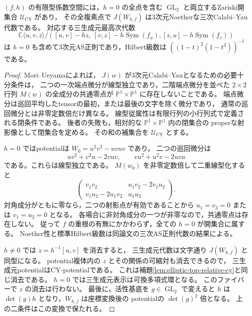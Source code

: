 \begin{lemma}[全可換最高次点を含む正則開集合]
\label{lem:all-binary-quartic-as-open}
$(f,h)$ の有限型係数空間には，$h=0$ の全点を含む
$\operatorname{GL}_2$ と両立するZariski開集合 $\mathcal U_{\mathrm{CY}}$ があり，
その全複素点で $J(W_{h,f})$ は3次元Noetherな三次Calabi--Yau代数である。
対応する三生成元最高次代数
\[
 \mathbb C\langle u,v,z\rangle/
 ([u,v]-hz,\ [v,z]-h\operatorname{Sym}(f_u),
                 [z,u]-h\operatorname{Sym}(f_v))
\]
は $h=0$ も含めて3次元AS正則であり，Hilbert級数は
$((1-t)^2(1-t^2))^{-1}$ である。
\end{lemma}
\begin{proof}
Mori--Ueyama\cite[Theorem~3.4]{MoriUeyama2019}によれば，
$J(w)$ が3次元Calabi--Yauとなるための必要十分条件は，
二つの一次端点微分が線型独立であり，二階端点微分を並べた
$2\times2$ 行列 $M(w)$ の全成分の共通零点が
$\mathbb P^1\times\mathbb P^1$ に存在しないことである。
端点微分は巡回平均したtensorの最初，または最後の文字を除く微分であり，
通常の巡回微分とは非零定数倍だけ異なる。
線型従属性は有限行列の小行列式で定義される閉条件である。
後者の失敗も，相対的な $\mathbb P^1\times\mathbb P^1$ 内の閉集合の
properな射影像として閉集合を定める。
その和の補集合を $\mathcal U_{\mathrm{CY}}$ とする。

$h=0$ ではpotentialは $W_0=u^2v^2-uvuv$ であり，
二つの巡回微分は
\[
 uv^2+v^2u-2vuv,\qquad vu^2+u^2v-2uvu
\]
である。これらは線型独立である。
$M(w_0)$ を非零定数倍して二重線型化すると
\[
 \begin{pmatrix}
 v_1v_2&u_1v_2-2v_1u_2\\
 v_1u_2-2u_1v_2&u_1u_2
 \end{pmatrix}.
\]
対角成分がともに零なら，二つの射影点が有効であることから
$u_1=v_2=0$ または $v_1=u_2=0$ となる。
各場合に非対角成分の一つが非零なので，共通零点は存在しない。
従って $f$ の重根の有無にかかわらず，全ての $h=0$ が開集合に属する。
Noether性と標準Hilbert級数は同論文の三次AS正則代数の結果による。

$h\ne0$ では $z=h^{-1}[u,v]$ を消去すると，
三生成元代数は文字通り $J(W_{h,f})$ と同型になる。
potential複体内の $z$ とその関係の可縮対も消去できるので，
三生成元potentialはCY-potentialである。
これは補題\ref{lem:elliptic-top-relative-cy}と同じ消去である。
$h=0$ では三生成元表示は可換多項式環となる。
このファイバーで $z$ の消去は行わない。
最後に，活性基底を $g\in\operatorname{GL}_2$ で変えると
$h$ は $\det(g)h$ となり，$W_{h,f}$ は座標変換後の
potentialの $\det(g)^2$ 倍となる。
上の二条件はこの変換で保たれる。
\end{proof}

